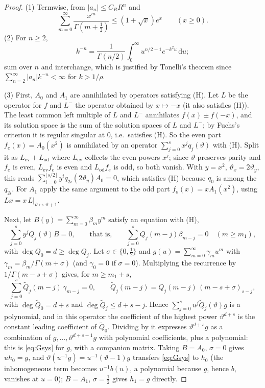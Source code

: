 \documentclass[11pt,reqno]{amsart}
\theoremstyle{definition}
\theoremstyle{remark}
\newcommand{\dd}{\,\mathrm{d}}
\begin{document}
\begin{proof}
(1) Termwise, from $|a_n| \le C_R R^n$ and
\[
  \sum_{m=0}^{\infty} \frac{x^m}{\Gamma(m+\frac12)} \le (1+\sqrt x)e^x \qquad (x \ge 0).
\]
(2) For $n \ge 2$,
\[
  k^{-n} = \frac{1}{\Gamma(n/2)}\int_0^\infty u^{n/2-1}e^{-k^2u}\dd u;
\]
sum over $n$ and interchange, which is justified by Tonelli's theorem since $\sum_{n=2}^{\infty} |a_n| k^{-n} < \infty$ for
$k > 1/\rho$.

(3) First, $A_0$ and $A_1$ are annihilated by operators satisfying (H). Let $L$ be the operator for $f$ and
$L^-$ the operator obtained by $x \mapsto -x$ (it also satisfies (H)). The least common left multiple
of $L$ and $L^-$ annihilates $f(x) \pm f(-x)$, and its solution space is the sum of the solution spaces of $L$
and $L^-$; by Fuchs's criterion it is regular singular at $0$, i.e.\ satisfies (H). So the even part
$f_e(x) = A_0(x^2)$ is annihilated by an operator $\sum_{j=0}^{s} x^j q_j(\vartheta)$ with (H). Split it as
$L_{\mathrm{ev}} + L_{\mathrm{od}}$ where $L_{\mathrm{ev}}$ collects the even powers $x^j$; since $\vartheta$ preserves parity and $f_e$ is even,
$L_{\mathrm{ev}} f_e$ is even and $L_{\mathrm{od}} f_e$ is odd, so both vanish. With $y = x^2$, $\vartheta_x = 2\vartheta_y$, this reads
$\sum_{i=0}^{\lfloor s/2\rfloor} y^i q_{2i}(2\vartheta_y) A_0 = 0$, which satisfies (H) because $q_0$ is among the $q_{2i}$.
For $A_1$ apply the same argument to the odd part $f_o(x) = xA_1(x^2)$, using
$L x = x\,L|_{\vartheta \mapsto \vartheta+1}$.

Next, let $B(y) = \sum_{m=0}^{\infty} \beta_m y^m$ satisfy an equation with (H),
\[
  \sum_{j=0}^s y^j Q_j(\vartheta)B = 0, \qquad\text{that is,}\qquad
  \sum_{j=0}^{s} Q_j(m-j)\beta_{m-j} = 0 \quad (m \ge m_1),
\]
with $\deg Q_0 = d \ge \deg Q_j$. Let $\sigma \in \{0,\frac12\}$ and $g(u) = \sum_{m=0}^{\infty} \gamma_m u^m$ with
$\gamma_m = \beta_m/\Gamma(m+\sigma)$ (and $\gamma_0 = 0$ if $\sigma = 0$). Multiplying the recurrence by $1/\Gamma(m - s + \sigma)$ gives, for $m \ge m_1 + s$,
\[
  \sum_{j=0}^s \widetilde Q_j(m-j)\, \gamma_{m-j} = 0, \qquad
  \widetilde Q_j(m - j) = Q_j(m-j)\, (m - s + \sigma)_{s-j},
\]
with $\deg \widetilde Q_0 = d + s$ and $\deg \widetilde Q_j \le d + s - j$. Hence
$\sum_{j=0}^{s} u^j \widetilde Q_j(\vartheta) g$ is a polynomial, and in this operator the coefficient of the
highest power $\vartheta^{d+s}$ is the constant leading coefficient of $\widetilde Q_0$. Dividing by it
expresses $\vartheta^{d+s}g$ as a combination of $g, \dots, \vartheta^{d+s-1}g$ with polynomial
coefficients, plus a polynomial: this is \eqref{eq:Gsys} for $g$, with a companion matrix. Taking
$B = A_0$, $\sigma = 0$ gives $u h_0 = g$, and $\vartheta(u^{-1}g) = u^{-1}(\vartheta - 1)g$ transfers
\eqref{eq:Gsys} to $h_0$ (the inhomogeneous term becomes $u^{-1}b(u)$, a polynomial because $g$, hence
$b$, vanishes at $u = 0$); $B = A_1$, $\sigma = \frac12$ gives $h_1 = g$ directly.
\end{proof}
\end{document}
